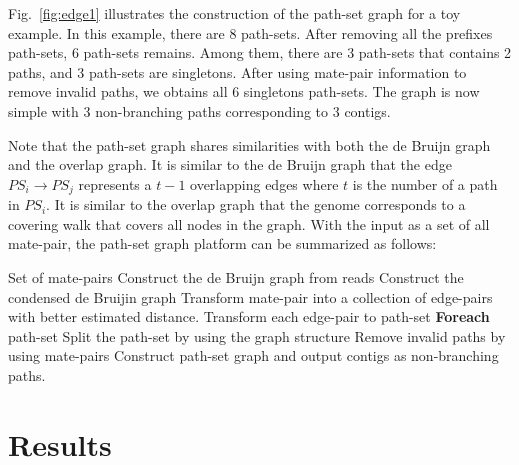 \documentclass[12pt,a4paper,oneside]{article}
\begin{document}
Fig.~\ref{fig:edge1} illustrates the construction of the path-set graph for a toy example. In this example, there are 8 path-sets. After removing 
all the prefixes path-sets, 6 path-sets remains. Among them, there are 3 path-sets that contains 2 paths, and 3 path-sets are singletons. 
After using mate-pair information to remove invalid paths, we obtains all 6 singletons path-sets. The graph is now simple with 3 non-branching paths corresponding to 
3 contigs. 




Note that the path-set graph shares similarities with both the de Bruijn graph and the overlap graph. 
It is similar to the de Bruijn graph that the edge $PS_i \rightarrow PS_j$ represents a $t-1$ overlapping edges 
where $t$ is the number of a path in $PS_i$. It is similar to the overlap graph that the genome corresponds to 
a covering walk that covers all nodes in the graph. With the input as a set of all mate-pair, the path-set 
graph platform can be summarized as follows:



\begin{algorithmic}[1]
\REQUIRE Set of mate-pairs
\STATE Construct the de Bruijn graph from reads
\STATE Construct the condensed de Bruijin graph
\STATE Transform mate-pair into a collection of edge-pairs with better estimated distance.
\STATE Transform each edge-pair to path-set
\STATE \textbf{Foreach} path-set
\STATE  \hspace*{0.5cm} Split the path-set  by using  the graph structure
\STATE \hspace*{0.5cm} Remove invalid paths by using mate-pairs
\STATE Construct path-set graph and output contigs as non-branching paths.
\end{algorithmic}

\section{Results}
\end{document}
